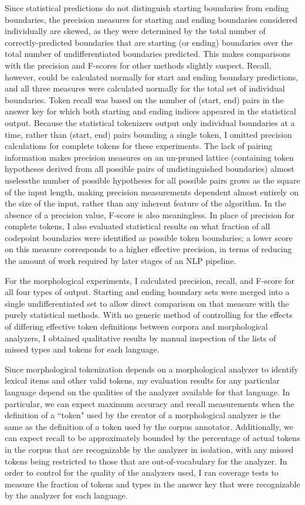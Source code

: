 Since statistical predictions do not distinguish starting boundaries from ending boundaries, the precision measures for starting and ending boundaries considered individually are skewed, as they were determined by the total number of correctly-predicted boundaries that are starting (or ending) boundaries over the total number of undifferentiated boundaries predicted. This makes comparisons with the precision and F-scores for other methods slightly suspect. Recall, however, could be calculated normally for start and ending boundary predictions, and all three measures were calculated normally for the total set of individual boundaries. Token recall was based on the number of (start, end) pairs in the answer key for which both starting and ending indices appeared in the statistical output. Because the statistical tokenizers output only individual boundaries at a time, rather than (start, end) pairs bounding a single token, I omitted precision calculations for complete tokens for these experiments. The lack of pairing information makes precision measures on an un-pruned lattice (containing token hypotheses derived from all possible pairs of undistinguished boundaries) almost useless\textemdash the number of possible hypotheses for all possible pairs grows as the square of the input length, making precision measurements dependent almost entirely on the size of the input, rather than any inherent feature of the algorithm. In the absence of a precision value, F-score is also meaningless. In place of precision for complete tokens, I also evaluated statistical results on what fraction of all codepoint boundaries were identified as possible token boundaries; a lower score on this measure corresponds to a higher effective precision, in terms of reducing the amount of work required by later stages of an NLP pipeline.

For the morphological experiments, I calculated precision, recall, and F-score for all four types of output. Starting and ending boundary sets were merged into a single undifferentiated set to allow direct comparison on that measure with the purely statistical methods. With no generic method of controlling for the effects of differing effective token definitions between corpora and morphological analyzers, I obtained qualitative results by manual inspection of the lists of missed types and tokens for each language.

Since morphological tokenization depends on a morphological analyzer to identify lexical items and other valid tokens, my evaluation results for any particular language depend on the qualities of the analyzer available for that language. In particular, we can expect maximum accuracy and recall measurements when the definition of a ``token" used by the creator of a morphological analyzer is the same as the definition of a token used by the corpus annotator. Additionally, we can expect recall to be approximately bounded by the percentage of actual tokens in the corpus that are recognizable by the analyzer in isolation, with any missed tokens being restricted to those that are out-of-vocabulary for the analyzer.
In order to control for the quality of the analyzers used, I ran coverage tests to measure the fraction of tokens and types in the answer key that were recognizable by the analyzer for each language.

